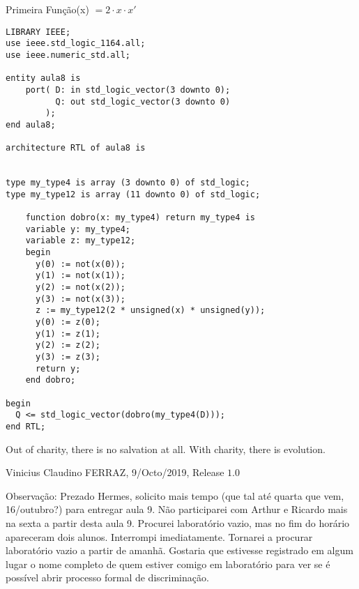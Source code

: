 \documentclass[12pt]{article}
\begin{document}
\Large

\begin{center}
Primeira Fun\c{c}\~ao(x) $= 2 \cdot x \cdot x'$
\end{center}

\normalsize

\begin{verbatim}
LIBRARY IEEE;
use ieee.std_logic_1164.all;
use ieee.numeric_std.all;

entity aula8 is
	port( D: in std_logic_vector(3 downto 0);
	      Q: out std_logic_vector(3 downto 0)
	    );
end aula8;

architecture RTL of aula8 is


type my_type4 is array (3 downto 0) of std_logic;
type my_type12 is array (11 downto 0) of std_logic;

	function dobro(x: my_type4) return my_type4 is
	variable y: my_type4;
	variable z: my_type12;
	begin
	  y(0) := not(x(0));
	  y(1) := not(x(1));
	  y(2) := not(x(2));
	  y(3) := not(x(3));
	  z := my_type12(2 * unsigned(x) * unsigned(y));
	  y(0) := z(0);
	  y(1) := z(1);
	  y(2) := z(2);
	  y(3) := z(3);
	  return y;
	end dobro;

begin
  Q <= std_logic_vector(dobro(my_type4(D)));
end RTL;
\end{verbatim}


\vspace{3mm}

Out of charity, there is no salvation at all. With charity, there is evolution.

\vspace{3mm}

Vinicius Claudino FERRAZ, 9/Octo/2019, Release $1.0$

\vspace{3mm}

Observa\c{c}\~ao: Prezado Hermes, solicito mais tempo (que tal at\'e quarta que vem, 16/outubro?) para entregar aula 9. N\~ao participarei com Arthur e Ricardo mais na sexta a partir desta aula 9.  Procurei laborat\'orio vazio, mas no fim do hor\'ario apareceram dois alunos. Interrompi imediatamente. Tornarei a procurar laborat\'orio vazio a partir de amanh\~a. Gostaria que estivesse registrado em algum lugar o nome completo de quem estiver comigo em laborat\'orio para ver se \'e poss\'ivel abrir processo formal de discrimina\c{c}\~ao.
\end{document}
